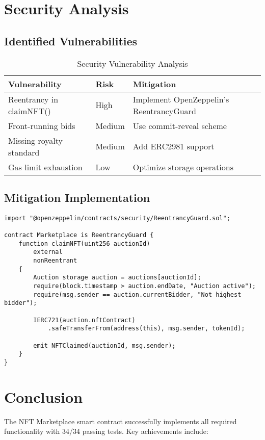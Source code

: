 \documentclass{article}
\begin{document}
\section{Security Analysis}

\subsection{Identified Vulnerabilities}

\begin{table}[h]
\centering
\begin{tabular}{p{4cm} p{4cm} p{4cm}}
\toprule
\textbf{Vulnerability} & \textbf{Risk} & \textbf{Mitigation} \\
\midrule
Reentrancy in claimNFT() & High & Implement OpenZeppelin's ReentrancyGuard \\
Front-running bids & Medium & Use commit-reveal scheme \\
Missing royalty standard & Medium & Add ERC2981 support \\
Gas limit exhaustion & Low & Optimize storage operations \\
\bottomrule
\end{tabular}
\caption{Security Vulnerability Analysis}
\end{table}

\subsection{Mitigation Implementation}
\begin{lstlisting}[language=Solidity,caption={Reentrancy Protection}]
import "@openzeppelin/contracts/security/ReentrancyGuard.sol";

contract Marketplace is ReentrancyGuard {
    function claimNFT(uint256 auctionId) 
        external 
        nonReentrant 
    {
        Auction storage auction = auctions[auctionId];
        require(block.timestamp > auction.endDate, "Auction active");
        require(msg.sender == auction.currentBidder, "Not highest bidder");
        
        IERC721(auction.nftContract)
            .safeTransferFrom(address(this), msg.sender, tokenId);
            
        emit NFTClaimed(auctionId, msg.sender);
    }
}
\end{lstlisting}

\section*{Conclusion}
The NFT Marketplace smart contract successfully implements all required functionality with 34/34 passing tests. Key achievements include:
\end{document}
